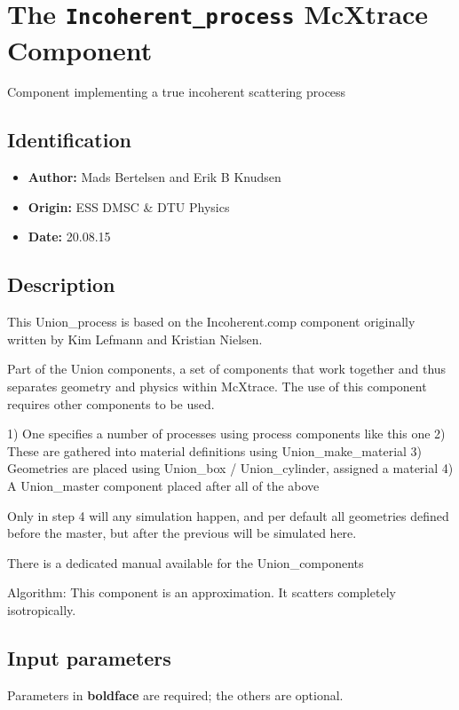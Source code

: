 \section{The \texttt{Incoherent\_process} McXtrace Component}
Component implementing a true incoherent scattering process

\subsection*{Identification}
\begin{itemize}
  \item \textbf{Author:} Mads Bertelsen and Erik B Knudsen
  \item \textbf{Origin:} ESS DMSC \& DTU Physics
  \item \textbf{Date:} 20.08.15
\end{itemize}

\subsection*{Description}
This Union\_process is based on the Incoherent.comp component originally written by Kim Lefmann and Kristian Nielsen.

Part of the Union components, a set of components that work together and thus separates geometry and physics within McXtrace. The use of this component requires other components to be used.

1) One specifies a number of processes using process components like this one 2) These are gathered into material definitions using Union\_make\_material 3) Geometries are placed using Union\_box / Union\_cylinder, assigned a material 4) A Union\_master component placed after all of the above

Only in step 4 will any simulation happen, and per default all geometries defined before the master, but after the previous will be simulated here.

There is a dedicated manual available for the Union\_components

Algorithm: This component is an approximation. It scatters completely isotropically.

\subsection*{Input parameters}
Parameters in \textbf{boldface} are required; the others are optional.

